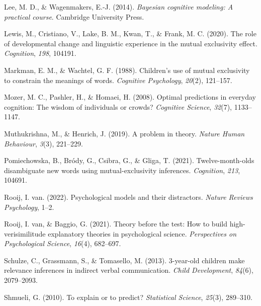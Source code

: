 \documentclass[
  man,mask,floatsintext]{apa6}
\newlength{\cslhangindent}
\newlength{\cslentryspacingunit} %
\newenvironment{CSLReferences}[2] %
 {%
  \setlength{\parindent}{0pt}
  \ifodd #1
  \let\oldpar\par
  \def\par{\hangindent=\cslhangindent\oldpar}
  \fi
  \setlength{\parskip}{#2\cslentryspacingunit}
 }%
 {}
\begin{document}
\begin{CSLReferences}{1}{0}
\leavevmode{}%
Lee, M. D., \& Wagenmakers, E.-J. (2014). \emph{Bayesian cognitive modeling: A practical course}. Cambridge University Press.

\leavevmode{}%
Lewis, M., Cristiano, V., Lake, B. M., Kwan, T., \& Frank, M. C. (2020). The role of developmental change and linguistic experience in the mutual exclusivity effect. \emph{Cognition}, \emph{198}, 104191.

\leavevmode{}%
Markman, E. M., \& Wachtel, G. F. (1988). Children's use of mutual exclusivity to constrain the meanings of words. \emph{Cognitive Psychology}, \emph{20}(2), 121--157.

\leavevmode{}%
Mozer, M. C., Pashler, H., \& Homaei, H. (2008). Optimal predictions in everyday cognition: The wisdom of individuals or crowds? \emph{Cognitive Science}, \emph{32}(7), 1133--1147.

\leavevmode{}%
Muthukrishna, M., \& Henrich, J. (2019). A problem in theory. \emph{Nature Human Behaviour}, \emph{3}(3), 221--229.

\leavevmode{}%
Pomiechowska, B., Bródy, G., Csibra, G., \& Gliga, T. (2021). Twelve-month-olds disambiguate new words using mutual-exclusivity inferences. \emph{Cognition}, \emph{213}, 104691.

\leavevmode{}%
Rooij, I. van. (2022). Psychological models and their distractors. \emph{Nature Reviews Psychology}, 1--2.

\leavevmode{}%
Rooij, I. van, \& Baggio, G. (2021). Theory before the test: How to build high-verisimilitude explanatory theories in psychological science. \emph{Perspectives on Psychological Science}, \emph{16}(4), 682--697.

\leavevmode{}%
Schulze, C., Grassmann, S., \& Tomasello, M. (2013). 3-year-old children make relevance inferences in indirect verbal communication. \emph{Child Development}, \emph{84}(6), 2079--2093.

\leavevmode{}%
Shmueli, G. (2010). To explain or to predict? \emph{Statistical Science}, \emph{25}(3), 289--310.


\end{CSLReferences}
\end{document}
